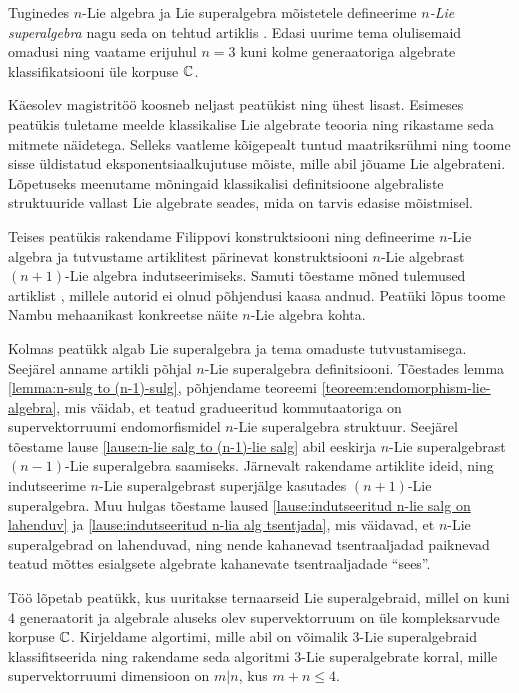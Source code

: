 Tuginedes $n$-Lie algebra ja Lie superalgebra mõistetele defineerime
\emph{$n$-Lie superalgebra} nagu seda on tehtud artiklis \cite{Abramov:2014}.
Edasi uurime tema olulisemaid omadusi ning vaatame erijuhul $n = 3$ kuni
kolme generaatoriga algebrate klassifikatsiooni üle korpuse $\mathbb{C}$.


Käesolev magistritöö koosneb neljast peatükist ning ühest lisast.
Esimeses peatükis tuletame meelde klassikalise Lie algebrate teooria ning
rikastame seda mitmete näidetega. Selleks vaatleme kõigepealt tuntud
maatriksrühmi ning toome sisse üldistatud eksponentsiaalkujutuse mõiste,
mille abil jõuame Lie algebrateni. Lõpetuseks meenutame mõningaid klassikalisi
definitsioone algebraliste struktuuride vallast Lie algebrate seades, mida
on tarvis edasise mõistmisel.

Teises peatükis rakendame Filippovi konstruktsiooni ning defineerime $n$-Lie
algebra ja tutvustame artiklitest \cite{AKMS:2014, AMS:2011}
pärinevat konstruktsiooni $n$-Lie algebrast $(n+1)$-Lie algebra indutseerimiseks.
Samuti tõestame mõned tulemused artiklist \cite{AKMS:2014}, millele autorid
ei olnud põhjendusi kaasa andnud. Peatüki lõpus toome Nambu mehaanikast
konkreetse näite $n$-Lie algebra kohta.

Kolmas peatükk algab Lie superalgebra ja tema omaduste tutvustamisega. Seejärel
anname artikli \cite{Abramov:2014} põhjal $n$-Lie superalgebra definitsiooni.
Tõestades lemma \ref{lemma:n-sulg to (n-1)-sulg}, põhjendame teoreemi
\ref{teoreem:endomorphism-lie-algebra}, mis väidab, et teatud gradueeritud
kommutaatoriga on supervektorruumi endomorfismidel $n$-Lie superalgebra
struktuur. Seejärel tõestame lause \ref{lause:n-lie salg to (n-1)-lie salg}
abil eeskirja $n$-Lie superalgebrast $(n-1)$-Lie superalgebra saamiseks.
Järnevalt rakendame artiklite \cite{Abramov:2014,AKMS:2014} ideid, ning
indutseerime $n$-Lie superalgebrast superjälge kasutades $(n+1)$-Lie
superalgebra. Muu hulgas tõestame laused
\ref{lause:indutseeritud n-lie salg on lahenduv} ja
\ref{lause:indutseeritud n-lia alg tsentjada}, mis väidavad, et
$n$-Lie superalgebrad on lahenduvad, ning nende kahanevad tsentraaljadad
paiknevad teatud mõttes esialgsete algebrate kahanevate tsentraaljadade
``sees''.

Töö lõpetab peatükk, kus uuritakse ternaarseid Lie superalgebraid, millel
on kuni $4$ generaatorit ja algebrale aluseks olev supervektorruum on
üle kompleksarvude korpuse $\mathbb{C}$. Kirjeldame algortimi, mille abil on võimalik
$3$-Lie superalgebraid klassifitseerida ning rakendame seda algoritmi
$3$-Lie superalgebrate korral, mille supervektorruumi dimensioon on $m|n$, kus
$m + n \leq 4$.

